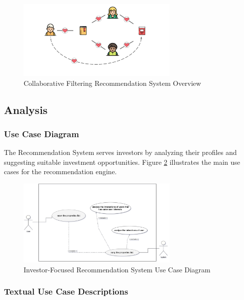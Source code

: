 \begin{figure}[htbp]
    \centering
    \includegraphics[width=0.7\textwidth]{images/collaborative_filtring.png}
    \caption{Collaborative Filtering Recommendation System Overview}
    \label{fig:collaborative-filtering-overview}
\end{figure}

\subsection{Analysis}
\subsubsection{Use Case Diagram}
The Recommendation System serves investors by analyzing their profiles and suggesting suitable investment opportunities. Figure \ref{fig:recommendation-use-case} illustrates the main use cases for the recommendation engine.

\begin{figure}[htbp]
    \centering
    \includegraphics[width=0.7\textwidth]{images/recommendation_use_case_diagram.png}
    \caption{Investor-Focused Recommendation System Use Case Diagram}
    \label{fig:recommendation-use-case}
\end{figure}

\subsubsection{Textual Use Case Descriptions}

